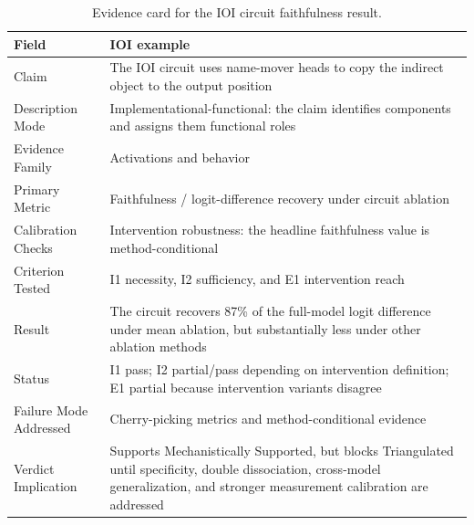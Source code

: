 \documentclass{article}
\begin{document}
\begin{table}[H]
\centering
\small
\caption{Evidence card for the IOI circuit faithfulness result.}
\renewcommand{\arraystretch}{1.2}
\begin{tabular}{@{}lp{10cm}@{}}
\toprule
\textbf{Field} & \textbf{IOI example} \\
\midrule
Claim & The IOI circuit uses name-mover heads to copy the indirect object to the output position \\
\midrule
Description Mode & Implementational-functional: the claim identifies components and assigns them functional roles \\
\midrule
Evidence Family & Activations and behavior \\
\midrule
Primary Metric & Faithfulness / logit-difference recovery under circuit ablation \\
\midrule
Calibration Checks & Intervention robustness: the headline faithfulness value is method-conditional \\
\midrule
Criterion Tested & I1 necessity, I2 sufficiency, and E1 intervention reach \\
\midrule
Result & The circuit recovers 87\% of the full-model logit difference under mean ablation, but substantially less under other ablation methods \\
\midrule
Status & I1 pass; I2 partial/pass depending on intervention definition; E1 partial because intervention variants disagree \\
\midrule
Failure Mode Addressed & Cherry-picking metrics and method-conditional evidence \\
\midrule
Verdict Implication & Supports Mechanistically Supported, but blocks Triangulated until specificity, double dissociation, cross-model generalization, and stronger measurement calibration are addressed \\
\bottomrule
\end{tabular}
\label{tabevidencecardioi}
\end{table}
\end{document}

